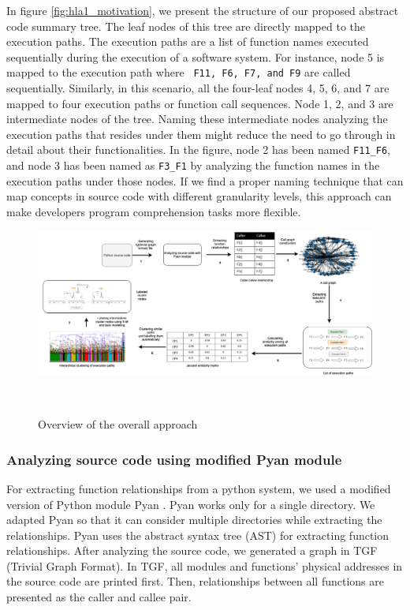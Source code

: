 In figure \ref{fig:hla1_motivation}, we present the structure of our proposed abstract code summary tree. The leaf nodes of this tree are directly mapped to the execution paths. The execution paths are a list of function names executed sequentially during the execution of a software system. For instance, node 5 is mapped to the execution path where \texttt{ F11, F6, F7, and F9} are called sequentially. Similarly,  in this scenario, all the four-leaf nodes 4, 5, 6, and 7 are mapped to four execution paths or function call sequences. Node 1, 2, and 3 are intermediate nodes of the tree. Naming these intermediate nodes analyzing the execution paths that resides under them might reduce the need to go through in detail about their functionalities. In the figure, node 2 has been named \texttt{F11\_F6}, and node 3 has been named as \texttt{F3\_F1}  by analyzing the function names in the execution paths under those nodes. If we find a proper naming technique that can map concepts in source code with different granularity levels, this approach can make developers program comprehension tasks more flexible.
  

\begin{figure}[tb]
  \centering
  \includegraphics[width=\columnwidth]{figures/hla1/visual_tool_static_call_graph.png}
  \caption{Overview of the overall approach}~\label{fig:overall}
\end{figure}

\subsubsection{Analyzing source code using modified Pyan module}

For extracting function relationships from a python system, we used a modified version of Python module Pyan \cite{pyan}. Pyan works only for a single directory. We adapted Pyan so that it can consider multiple directories while extracting the relationships. Pyan uses the abstract syntax tree (AST) for extracting function relationships. After analyzing the source code, we generated a graph in TGF (Trivial Graph Format). In TGF, all modules and functions' physical addresses in the source code are printed first. Then, relationships between all functions are presented as the caller and callee pair.

